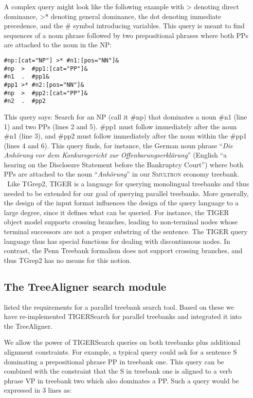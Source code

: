 \documentclass[output=paper]{LSP/langsci}
\begin{document}
A complex query might look like the following example with  {\textgreater} denoting direct dominance, {\textgreater}* denoting general dominance, the dot denoting immediate precedence, and the \# symbol introducing variables. This query is meant to find sequences of a noun phrase followed by two prepositional phrases where both PPs are attached to the noun in the NP:

\ea
 \begin{lstlisting}
#np:[cat="NP"] >* #n1:[pos="NN"]&
#np  >  #pp1:[cat="PP"]& 
#n1  .  #pp1& 
#pp1 >* #n2:[pos="NN"]& 
#np  >  #pp2:[cat="PP"]& 
#n2  .  #pp2 
 \end{lstlisting}
\z

This query says: Search for an NP (call it \#np) that dominates a noun \#n1 (line 1) and two PPs (lines 2 and 5). \#pp1 must follow immediately after the noun \#n1 (line 3), and \#pp2 must follow immediately after the noun within the \#pp1 (lines 4 and 6). This query finds, for instance, the German noun phrase ``\textit{Die Anhörung vor dem Konkursgericht zur Offenbarungserklärung}'' (English ``a hearing on the Disclosure Statement before the Bankruptcy Court'') where both PPs are attached to the noun ``\textit{Anhörung}'' in our S\textsc{multron} economy treebank. 
\
Like TGrep2, TIGER is a language for querying monolingual treebanks and thus needed to be extended for our goal of querying parallel treebanks. More generally, the design of the input format influences the design of the query language to a large degree, since it defines what can be queried. For instance, the TIGER object model supports crossing branches, leading to non-terminal nodes whose terminal successors are not a proper substring of the sentence. The TIGER query language thus has special functions for dealing with discontinuous nodes. In contrast, the Penn Treebank formalism does not support crossing branches, and thus TGrep2 has no means for this notion. 

\subsection{The TreeAligner search module}\label{sec:volk:3.2}

\citet{Merz2005} listed the requirements for a parallel treebank search tool. Based on these we have re-implemented TIGERSearch for parallel treebanks and integrated it into the TreeAligner. 

We allow the power of TIGERSearch queries on both treebanks plus additional alignment constraints. For example, a typical query could ask for a sentence S dominating a prepositional phrase PP in treebank one. This query can be combined with the constraint that the S in treebank one is aligned to a verb phrase VP in treebank two which also dominates a PP. Such a query would be expressed in 3 lines as:
\end{document}
